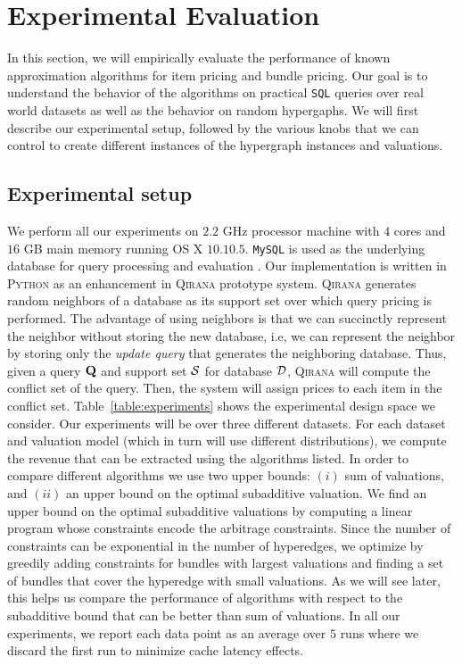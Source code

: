 \section{Experimental Evaluation}

In this section, we will empirically evaluate the performance of known approximation algorithms for item pricing and bundle pricing. Our goal is to understand the behavior of the algorithms on practical \texttt{SQL} queries over real world datasets as well as the behavior on random hypergaphs. We will first describe our experimental setup, followed by the various knobs that we can control to create different instances of the hypergraph instances and valuations. 

\subsection{Experimental setup}

We perform all our experiments on $2.2$ GHz processor machine with $4$ cores and $16$ GB main memory running OS X $10.10.5$. \texttt{MySQL} is used as the underlying database for query processing and evaluation . Our implementation is written in \textsc{Python} as an enhancement in \textsc{Qirana} prototype system. \textsc{Qirana} generates random neighbors of a database as its support set over which query pricing is performed. The advantage of using neighbors is that we can succinctly represent the neighbor without storing the new database, i.e, we can represent the neighbor by storing only the \emph{update query} that generates the neighboring database. Thus, given a query $\mathbf{Q}$ and support set $\mathcal{S}$ for database $\mathcal{D}$, \textsc{Qirana} will compute the conflict set of the query. Then, the system will assign prices to each item in the conflict set.
Table~\ref{table:experiments} shows the experimental design space we consider. Our experiments will be over three different datasets. For each dataset and valuation model (which in turn will use different distributions), we compute the revenue that can be extracted using the algorithms listed. In order to compare different algorithms we use two upper bounds: $(i)$ sum of valuations, and $(ii)$ an upper bound on the optimal subadditive valuation. We find an upper bound on the optimal subadditive valuations by computing a linear program whose constraints encode the arbitrage constraints. Since the number of constraints can be exponential in the number of hyperedges, we optimize by greedily adding constraints for bundles with largest valuations and finding a set of bundles that cover the hyperedge with small valuations. As we will see later, this helps us compare the performance of algorithms with respect to the subadditive bound that can be better than sum of valuations. In all our experiments, we report each data point as an average over $5$ runs where we discard the first run to minimize cache latency effects.

